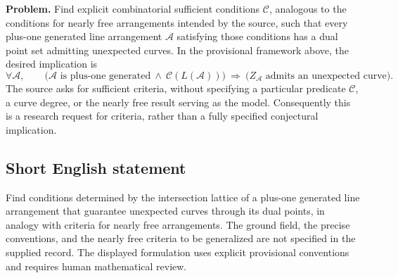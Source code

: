 \documentclass[11pt]{article}
\begin{document}
\textbf{Problem.} Find explicit combinatorial sufficient conditions \(\mathcal C\), analogous to the conditions for nearly free arrangements intended by the source, such that every plus-one generated line arrangement \(\mathcal A\) satisfying those conditions has a dual point set admitting unexpected curves. In the provisional framework above, the desired implication is
\[
\forall\mathcal A,\qquad
\bigl(\mathcal A\text{ is plus-one generated}
\ \land\ \mathcal C(L(\mathcal A))\bigr)
\ \Longrightarrow\
\bigl(Z_{\mathcal A}\text{ admits an unexpected curve}\bigr).
\]
The source asks for sufficient criteria, without specifying a particular predicate \(\mathcal C\), a curve degree, or the nearly free result serving as the model. Consequently this is a research request for criteria, rather than a fully specified conjectural implication.
\subsection{Short English statement}
Find conditions determined by the intersection lattice of a plus-one generated line arrangement that guarantee unexpected curves through its dual points, in analogy with criteria for nearly free arrangements. The ground field, the precise conventions, and the nearly free criteria to be generalized are not specified in the supplied record. The displayed formulation uses explicit provisional conventions and requires human mathematical review.
\end{document}
